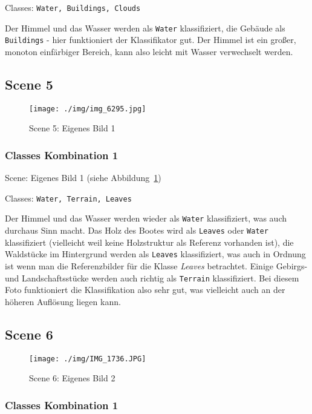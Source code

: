 Classes: \texttt{Water, Buildings, Clouds}

Der Himmel und das Wasser werden als \texttt{Water} klassifiziert, die Gebäude als \texttt{Buildings} - hier funktioniert der Klassifikator gut. Der Himmel ist ein großer, monoton einfärbiger Bereich, kann also leicht mit Wasser verwechselt werden.



\subsection{Scene 5}

\begin{figure}[htb!]
 \centering
 \texttt{[image: ./img/img\_6295.jpg]}
 \caption{Scene 5: Eigenes Bild 1}
 \label{fig:PZ}
\end{figure}

\subsubsection{Classes Kombination 1}

Scene: Eigenes Bild 1 (siehe Abbildung~\ref{fig:PZ})

Classes: \texttt{Water, Terrain, Leaves}

Der Himmel und das Wasser werden wieder als \texttt{Water} klassifiziert, was auch durchaus Sinn macht. Das Holz des Bootes wird als \texttt{Leaves} oder \texttt{Water} klassifiziert (vielleicht weil keine Holzstruktur als Referenz vorhanden ist), die Waldstücke im Hintergrund werden als \texttt{Leaves} klassifiziert, was auch in Ordnung ist wenn man die Referenzbilder für die Klasse \emph{Leaves} betrachtet. Einige Gebirgs- und Landschaftsstücke werden auch richtig als \texttt{Terrain} klassifiziert. Bei diesem Foto funktioniert die Klassifikation also sehr gut, was vielleicht auch an der höheren Auflösung liegen kann.


\subsection{Scene 6}

\begin{figure}[htb!]
 \centering
 \texttt{[image: ./img/IMG\_1736.JPG]}
 \caption{Scene 6: Eigenes Bild 2}
 \label{fig:baum}
\end{figure}

\subsubsection{Classes Kombination 1}

